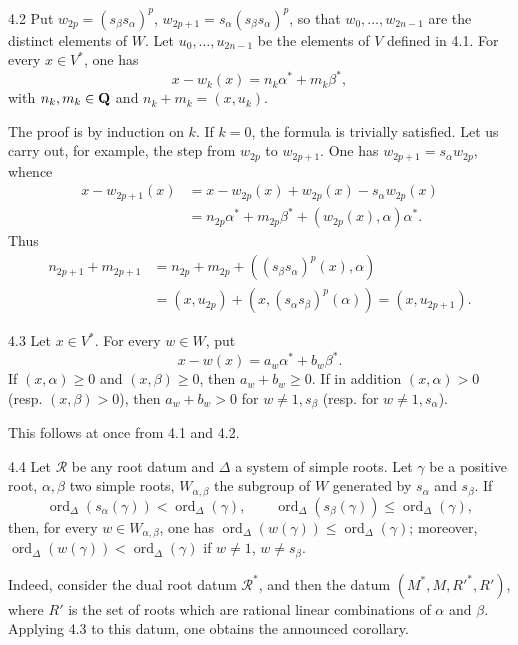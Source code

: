 \begin{lemma}{4.2}\label{XXI.4.2}
Put $w_{2p}=(s_\beta s_\alpha)^p$, $w_{2p+1}=s_\alpha(s_\beta s_\alpha)^p$, so that $w_0,\ldots,w_{2n-1}$ are the distinct elements of $W$. Let $u_0,\ldots,u_{2n-1}$ be the elements of $V$ defined in 4.1. For every $x\in V^*$, one has
\[
x-w_k(x)=n_k\alpha^*+m_k\beta^*,
\]
with $n_k,m_k\in\mathbf{Q}$ and $n_k+m_k=(x,u_k)$.{\renewcommand{\thefootnote}{(19)}}
\end{lemma}
The proof is by induction on $k$. If $k=0$, the formula is trivially satisfied. Let us carry out, for example, the step from $w_{2p}$ to $w_{2p+1}$. One has $w_{2p+1}=s_\alpha w_{2p}$, whence
\[
\begin{split}
x-w_{2p+1}(x)&=x-w_{2p}(x)+w_{2p}(x)-s_\alpha w_{2p}(x)\\
&=n_{2p}\alpha^*+m_{2p}\beta^*+(w_{2p}(x),\alpha)\alpha^*.
\end{split}
\]
Thus
\[
\begin{aligned}
n_{2p+1}+m_{2p+1}&=n_{2p}+m_{2p}+((s_\beta s_\alpha)^p(x),\alpha)\\
&=(x,u_{2p})+(x,(s_\alpha s_\beta)^p(\alpha))=(x,u_{2p+1}).
\end{aligned}
\]
\begin{corollary}{4.3}\label{XXI.4.3}
{\renewcommand{\thefootnote}{(20)}}%
Let $x\in V^*$. For every $w\in W$, put
\[
x-w(x)=a_w\alpha^*+b_w\beta^*.
\]
If $(x,\alpha)\geq0$ and $(x,\beta)\geq0$, then $a_w+b_w\geq0$. If in addition $(x,\alpha)>0$ (resp. $(x,\beta)>0$), then $a_w+b_w>0$ for $w\ne1,s_\beta$ (resp. for $w\ne1,s_\alpha$).
\end{corollary}
This follows at once from 4.1 and 4.2.
\begin{corollary}{4.4}\label{XXI.4.4}
Let $\mathcal R$ be any root datum and $\Delta$ a system of simple roots. Let $\gamma$ be a positive root, $\alpha,\beta$ two simple roots, $W_{\alpha,\beta}$ the subgroup of $W$ generated by $s_\alpha$ and $s_\beta$. If
\[
\operatorname{ord}_\Delta(s_\alpha(\gamma))<\operatorname{ord}_\Delta(\gamma),\qquad
\operatorname{ord}_\Delta(s_\beta(\gamma))\leq\operatorname{ord}_\Delta(\gamma),
\]
then, for every $w\in W_{\alpha,\beta}$, one has $\operatorname{ord}_\Delta(w(\gamma))\leq\operatorname{ord}_\Delta(\gamma)$; moreover, $\operatorname{ord}_\Delta(w(\gamma))<\operatorname{ord}_\Delta(\gamma)$ if $w\ne1$, $w\ne s_\beta$.
\end{corollary}
Indeed, consider the dual root datum $\mathcal R^*$, and then the datum $(M^*,M,R'^*,R')$, where $R'$ is the set of roots which are rational linear combinations of $\alpha$ and $\beta$. Applying 4.3 to this datum, one obtains the announced corollary.{\renewcommand{\thefootnote}{(21)}}

